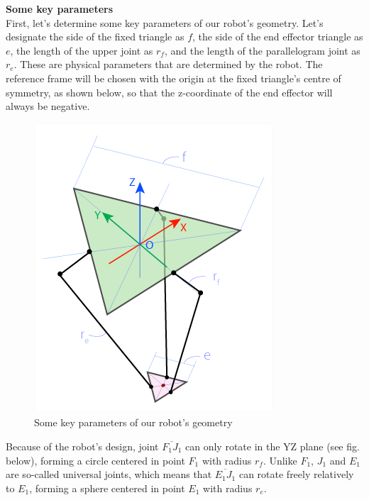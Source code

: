 \textbf{Some key parameters} \\

First, let's determine some key parameters of our robot's geometry. Let's designate the side of the fixed triangle as $f$, the side of the end effector triangle as $e$, the length of the upper joint as $r_{f}$,  and the length of the parallelogram joint as $r_{e}$. These are physical parameters that are determined by the robot. The reference frame will be chosen with the origin at the fixed triangle's centre of symmetry, as shown below, so that the z-coordinate of the end effector will always be negative.
\begin{figure}[H]
	\centering
	\includegraphics[width=\maxwidth{11cm}, keepaspectratio]{Chapters/Fig/key_parameters.png}
	\caption{Some key parameters of our robot's geometry}
	\label{fig:key_parameters}
\end{figure}
Because of the robot's design, joint $\overline{F_{1}J_{1}}$ can only rotate in the YZ plane (see fig. below), forming a circle centered in point $F_{1}$ with radius $r_{f}$. Unlike $F_{1}$, $J_{1}$ and $E_{1}$ are so-called universal joints, which means that $\overline{E_{1}J_{1}}$ can rotate freely relatively to $E_{1}$, forming a sphere centered in point $E_{1}$ with radius $r_{e}$.

